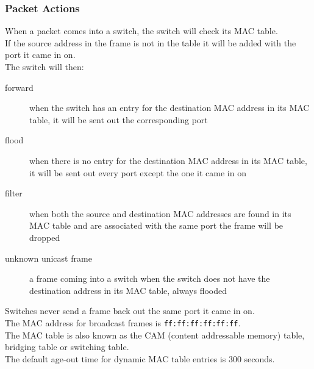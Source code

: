 \subsubsection{Packet Actions}

When a packet comes into a switch, the switch will check its MAC table.\\

If the source address in the frame is not in the table it will be added
with the port it came in on.\\

The switch will then:\\

\begin{description}

\item[forward]
when the switch has an entry for the destination MAC address in its MAC table,
it will be sent out the corresponding port

\item[flood]
when there is no entry for the destination MAC address in its MAC table,
it will be sent out every port except the one it came in on

\item[filter]
when both the source and destination MAC addresses are found in its MAC table
and are associated with the same port the frame will be dropped

\end{description}

\begin{description}

\item[unknown unicast frame]
a frame coming into a switch when the switch does not have the destination
address in its MAC table, always flooded

\end{description}

Switches never send a frame back out the same port it came in on.\\

The MAC address for broadcast frames is \texttt{ff:ff:ff:ff:ff:ff}.\\

The MAC table is also known as the CAM (content addressable memory) table,
bridging table or switching table.\\

The default age-out time for dynamic MAC table entries is 300 seconds.\\

